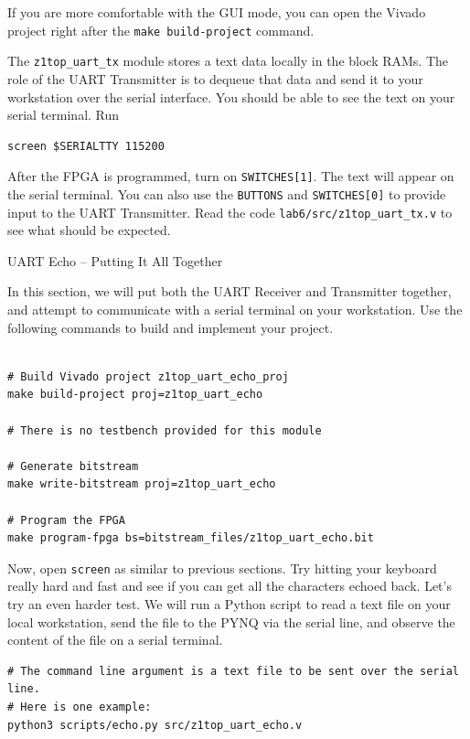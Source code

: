 \documentclass[11pt]{article}
\makeatletter
\renewcommand{\subsection}
{\@startsection {subsection}{1}{0pt}
 {-1ex}
 {0.5ex}
 {\bfseries\normalsize}}
\makeatother
\begin{document}
If you are more comfortable with the GUI mode, you can open the Vivado project right after the \texttt{make build-project} command.

The \verb|z1top_uart_tx| module stores a text data locally in the block RAMs. The role of the UART Transmitter is to dequeue that data and send it to your workstation over the serial interface. You should be able to see the text on your serial terminal. Run

\begin{verbatim}
screen $SERIALTTY 115200
\end{verbatim}

After the FPGA is programmed, turn on \verb|SWITCHES[1]|. The text will appear on the serial terminal. You can also use the \verb|BUTTONS| and \verb|SWITCHES[0]| to provide input to the UART Transmitter. Read the code \verb|lab6/src/z1top_uart_tx.v| to see what should be expected.

\subsection{UART Echo -- Putting It All Together}

In this section, we will put both the UART Receiver and Transmitter together, and attempt to communicate with a serial terminal on your workstation. Use the following commands to build and implement your project.

\begin{verbatim}

# Build Vivado project z1top_uart_echo_proj
make build-project proj=z1top_uart_echo

# There is no testbench provided for this module

# Generate bitstream
make write-bitstream proj=z1top_uart_echo

# Program the FPGA
make program-fpga bs=bitstream_files/z1top_uart_echo.bit
\end{verbatim}

Now, open \verb|screen| as similar to previous sections. Try hitting your keyboard really hard and fast and see if you can get all the characters echoed back. Let's try an even harder test. We will run a Python script to read a text file on your local workstation, send the file to the PYNQ via the serial line, and observe the content of the file on a serial terminal.

\begin{verbatim}
# The command line argument is a text file to be sent over the serial line.
# Here is one example:
python3 scripts/echo.py src/z1top_uart_echo.v
\end{verbatim}
\end{document}
